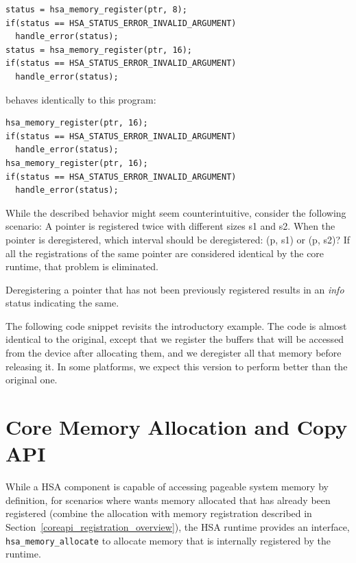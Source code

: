 \documentclass{book}
\begin{document}
\begin{framed}
\begin{lstlisting}
status = hsa_memory_register(ptr, 8);
if(status == HSA_STATUS_ERROR_INVALID_ARGUMENT)
  handle_error(status);
status = hsa_memory_register(ptr, 16);
if(status == HSA_STATUS_ERROR_INVALID_ARGUMENT)
  handle_error(status);
\end{lstlisting}
\end{framed}

behaves identically to this program\-:

\begin{framed}
\begin{lstlisting}
hsa_memory_register(ptr, 16);
if(status == HSA_STATUS_ERROR_INVALID_ARGUMENT)
  handle_error(status);
hsa_memory_register(ptr, 16);
if(status == HSA_STATUS_ERROR_INVALID_ARGUMENT)
  handle_error(status);
\end{lstlisting}
\end{framed}

While the described behavior might seem counterintuitive, consider
the following scenario\-: A pointer is registered twice with
different sizes s1 and s2. When the pointer is deregistered, which
interval should be deregistered\-: (p, s1) or (p, s2)? If all the
registrations of the same pointer are considered identical by the
core runtime, that problem is eliminated.

Deregistering a pointer that has not been previously registered
results in an \emph{info} status indicating the same.

The following code snippet revisits the introductory example. The
code is almost identical to the original, except that we register
the buffers that will be accessed from the device after allocating
them, and we deregister all that memory before releasing it. In some
platforms, we expect this version to perform better than the
original one.

\hypertarget{coreapi_device_memory}{}\section{Core Memory Allocation
and Copy API}\label{coreapi_device_memory}

While a HSA component is capable of accessing pageable system memory
by definition, for scenarios where wants memory allocated that has
already been registered (combine the allocation with memory
registration described in
Section~\ref{coreapi_registration_overview}), the HSA runtime
provides an interface, \texttt{hsa\_memory\_allocate} to allocate
memory that is internally registered by the runtime.
\end{document}
